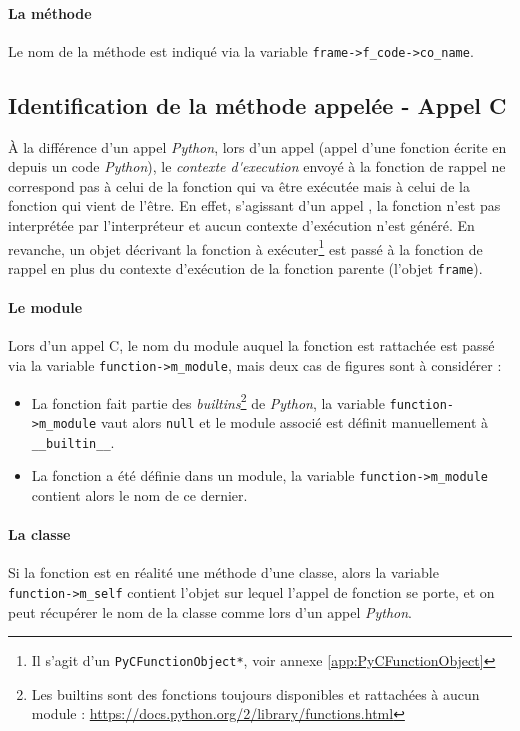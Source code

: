 \paragraph*{La méthode} Le nom de la méthode est indiqué via la variable \verb|frame->f_code->co_name|.
\clearpage
\subsection{Identification de la méthode appelée - Appel C}
À la différence d'un appel \emph{Python}, lors d'un appel \C (appel d'une fonction écrite en \C depuis un code \emph{Python}), le \emph{\gls{contexte d'execution}} envoyé à la fonction de rappel ne correspond pas à celui de la fonction qui va être exécutée mais à celui de la fonction qui vient de l'être. En effet, s'agissant d'un appel \C, la fonction n'est pas interprétée par l'interpréteur \Python et aucun contexte d'exécution n'est généré. En revanche, un objet décrivant la fonction \C à exécuter\footnote{Il s'agit d'un \verb?PyCFunctionObject*?, voir annexe \vref{app:PyCFunctionObject}} est passé à la fonction de rappel en plus du contexte d'exécution de la fonction parente (l'objet \verb|frame|).

\paragraph*{Le module} Lors d'un appel C, le nom du module auquel la fonction est rattachée est passé via la variable \verb|function->m_module|, mais deux cas de figures sont à considérer : 
\begin{itemize}
\item La fonction fait partie des \emph{builtins}\footnote{Les builtins sont des fonctions toujours disponibles et rattachées à aucun module : \url{https://docs.python.org/2/library/functions.html}} de \emph{Python}, la variable \verb|function->m_module| vaut alors \verb|null| et le module associé est définit manuellement à \verb|__builtin__|.
\item La fonction a été définie dans un module, la variable \verb|function->m_module| contient alors le nom de ce dernier.
\end{itemize}

\paragraph*{La classe} Si la fonction est en réalité une méthode d'une classe, alors la variable\\ \verb|function->m_self| contient l'objet sur lequel l'appel de fonction se porte, et on peut récupérer le nom de la classe comme lors d'un appel \emph{Python}.

